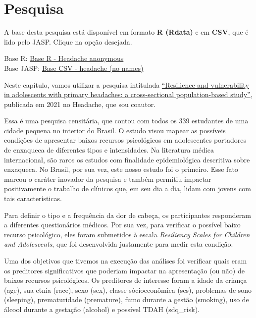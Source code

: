 \documentclass[
]{book}
\begin{document}
\hypertarget{pesquisa-10}{%
\section{Pesquisa}\label{pesquisa-10}}

\begin{base}

A base desta pesquisa está disponível em formato \textbf{R (Rdata)} e em
\textbf{CSV}, que é lido pelo JASP. Clique na opção desejada.

Base R:
\href{https://github.com/anovabr/mqt/raw/master/bases/Base\%20R\%20-\%20Headache\%20anonymous.RData}{Base
R - Headache anonymous}\\
Base JASP:
\href{https://github.com/anovabr/mqt/raw/master/bases/bases_csv_jasp.zip}{Base
CSV - headache (no names)}

\end{base}

Neste capítulo, vamos utilizar a pesquisa intitulada
\href{www.google.com}{``Resilience and vulnerability in adolescents with
primary headaches: a cross-sectional population-based study''},
publicada em 2021 no Headache, que sou coautor.

Essa é uma pesquisa censitária, que contou com todos os 339 estudantes
de uma cidade pequena no interior do Brasil. O estudo visou mapear as
possíveis condições de apresentar baixos recursos psicológicos em
adolescentes portadores de enxaqueca de diferentes tipos e intensidades.
Na literatura médica internacional, são raros os estudos com finalidade
epidemiológica descritiva sobre enxaqueca. No Brasil, por sua vez, este
nosso estudo foi o primeiro. Esse fato marcou o caráter inovador da
pesquisa e também permitiu impactar positivamente o trabalho de clínicos
que, em seu dia a dia, lidam com jovens com tais características.

Para definir o tipo e a frequência da dor de cabeça, os participantes
responderam a diferentes questionários médicos. Por sua vez, para
verificar o possível baixo recurso psicológico, eles foram submetidos à
escala \emph{Resiliency Scales for Children and Adolescents}, que foi
desenvolvida justamente para medir esta condição.

Uma dos objetivos que tivemos na execução das análises foi verificar
quais eram os preditores significativos que poderiam impactar na
apresentação (ou não) de baixos recursos psicológicos. Os preditores de
interesse foram a idade da criança (age), sua etnia (race), sexo (sex),
classe sócioeconômica (ses), problemas de sono (sleeping), prematuridade
(premature), fumo durante a gestão (smoking), uso de álcool durante a
gestação (alcohol) e possível TDAH (sdq\_risk).
\end{document}
